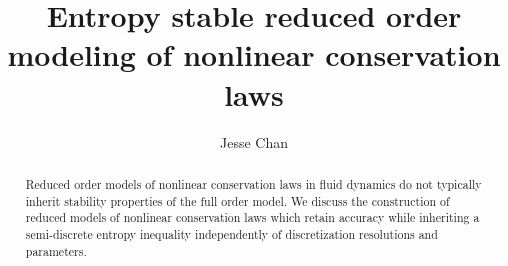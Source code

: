 \documentclass[review]{siamart171218}
\date{}
\author{Jesse Chan}
\title{Entropy stable reduced order modeling of nonlinear conservation laws}
\theoremstyle{assumption}
\begin{document}
\maketitle

\begin{abstract}
Reduced order models of nonlinear conservation laws in fluid dynamics do not typically inherit stability properties of the full order model. We discuss the construction of reduced models of nonlinear conservation laws which retain accuracy while inheriting a semi-discrete entropy inequality independently of discretization resolutions and parameters. 
\end{abstract}

\tableofcontents


\end{document}
